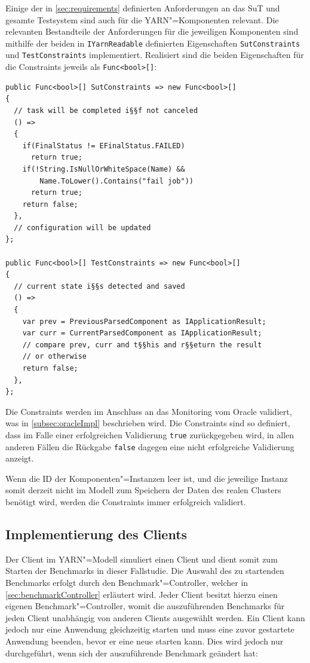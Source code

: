 Einige der in \cref{sec:requirements} definierten Anforderungen an das \ac{SuT} und gesamte Testsystem sind auch für die \ac{YARN}"=Komponenten relevant.
Die relevanten Bestandteile der Anforderungen für die jeweiligen Komponenten sind mithilfe der beiden in \texttt{IYarnReadable} definierten Eigenschaften \texttt{SutConstraints} und \texttt{TestConstraints} implementiert.
Realisiert sind die beiden Eigenschaften für die Constraints jeweils als \texttt{Func<bool>[]}:

\begin{lstlisting}[label=lst:constraintDefinition,style=cs,
caption={[Definition der Constraints in YarnApp]
    Definition der Constraints in \texttt{YarnApp} (gekürzt)}]
public Func<bool>[] SutConstraints => new Func<bool>[]
{
  // task will be completed i§§f not canceled
  () =>
  {
    if(FinalStatus != EFinalStatus.FAILED)
      return true;
    if(!String.IsNullOrWhiteSpace(Name) &&
        Name.ToLower().Contains("fail job"))
      return true;
    return false;
  },
  // configuration will be updated
};

public Func<bool>[] TestConstraints => new Func<bool>[]
{
  // current state i§§s detected and saved
  () =>
  {
    var prev = PreviousParsedComponent as IApplicationResult;
    var curr = CurrentParsedComponent as IApplicationResult;
    // compare prev, curr and t§§his and r§§eturn the result
    // or otherwise
    return false;
  },
};
\end{lstlisting}

Die Constraints werden im Anschluss an das Monitoring vom Oracle validiert, was in \cref{subsec:oracleImpl} beschrieben wird.
Die Constraints sind so definiert, dass im Falle einer erfolgreichen Validierung \texttt{true} zurückgegeben wird, in allen anderen Fällen die Rückgabe \texttt{false} dagegen eine nicht erfolgreiche Validierung anzeigt.

Wenn die ID der Komponenten"=Instanzen leer ist, und die jeweilige Instanz somit derzeit nicht im Modell zum Speichern der Daten des realen Clusters benötigt wird, werden die Constraints immer erfolgreich validiert.

\subsection{Implementierung des Clients}
\label{subsec:yarnClient}

Der Client im \ac{YARN}"=Modell simuliert einen Client und dient somit zum Starten der Benchmarks in dieser Fallstudie.
Die Auswahl des zu startenden Benchmarks erfolgt durch den Benchmark"=Controller, welcher in \cref{sec:benchmarkController} erläutert wird.
Jeder Client besitzt hierzu einen eigenen Benchmark"=Controller, womit die auszuführenden Benchmarks für jeden Client unabhängig von anderen Clients ausgewählt werden.
Ein Client kann jedoch nur eine Anwendung gleichzeitig starten und muss eine zuvor gestartete Anwendung beenden, bevor er eine neue starten kann.
Dies wird jedoch nur durchgeführt, wenn sich der auszuführende Benchmark geändert hat:

